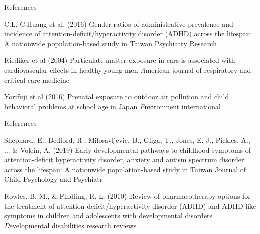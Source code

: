 \documentclass[aspectratio=169,xcolor=dvipsnames]{beamer}
\begin{document}
	\begin{frame}{References}
		\footnotesize{
			\begin{thebibliography}{99}
				 C.L.-C.Huang et al. (2016)
				\newblock Gender ratios of administrative prevalence and incidence of attention-deficit/hyperactivity disorder (ADHD) across the lifespan: A nationwide population-based study in Taiwan
				\newblock Psychiatry Research
			\end{thebibliography}
		}
		\footnotesize{
			\begin{thebibliography}{99}
				 Riediker et al (2004)
				\newblock Particulate matter exposure in cars is associated with cardiovascular effects in healthy young men
				\newblock \emph American journal of respiratory and critical care medicine
			\end{thebibliography}
		}
		\footnotesize{
			\begin{thebibliography}{99}
				Yorifuji et al (2016)
				\newblock Prenatal exposure to outdoor air pollution and child behavioral problems at school age in Japan
				\newblock \emph Environment international
			\end{thebibliography}
		}

		
	\end{frame}
	\setbeamertemplate{headline}{}
	\begin{frame}{References}
		\footnotesize{
			\begin{thebibliography}{99}
				 Shephard, E., Bedford, R., Milosavljevic, B., Gliga, T., Jones, E. J., Pickles, A., ... \& Volein, A. (2019)
				\newblock Early developmental pathways to childhood symptoms of attention‐deficit hyperactivity disorder, anxiety and autism spectrum disorder across the lifespan: A nationwide population-based study in Taiwan
				\newblock Journal of Child Psychology and Psychiatr
			\end{thebibliography}
		}
		\footnotesize{
			\begin{thebibliography}{99}
				 Rowles, B. M., \& Findling, R. L. (2010)
				\newblock Review of pharmacotherapy options for the treatment of attention‐deficit/hyperactivity disorder (ADHD) and ADHD‐like symptoms in children and adolescents with developmental disorders
				\newblock \emph Developmental disabilities research reviews
			\end{thebibliography}
		}
		
		
		
	\end{frame}
	
\end{document}
